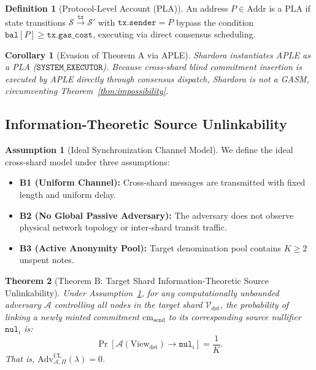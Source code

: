 \documentclass[journal,10pt,twocolumn]{IEEEtran}
\newtheorem{theorem}{Theorem}
\newtheorem{corollary}[theorem]{Corollary}
\theoremstyle{definition}
\newtheorem{definition}{Definition}
\newtheorem{assumption}{Assumption}
\theoremstyle{remark}
\begin{document}
\begin{definition}[Protocol-Level Account (PLA)]
An address $P \in \text{Addr}$ is a PLA if state transitions $\mathcal{S} \xrightarrow{\mathtt{tx}} \mathcal{S}'$ with $\mathtt{tx.sender} = P$ bypass the condition $\mathtt{bal}[P] \ge \mathtt{tx.gas\_cost}$, executing via direct consensus scheduling.
\end{definition}

\begin{corollary}[Evasion of Theorem A via APLE]
Shardora instantiates APLE as a PLA ($\mathtt{SYSTEM\_EXECUTOR}$). Because cross-shard blind commitment insertion is executed by APLE directly through consensus dispatch, Shardora is not a GASM, circumventing Theorem~\ref{thm:impossibility}.
\end{corollary}

\subsection{Information-Theoretic Source Unlinkability}

\begin{assumption}[Ideal Synchronization Channel Model]\label{assump:ideal}
We define the ideal cross-shard model under three assumptions:
\begin{itemize}
    \item \textbf{B1 (Uniform Channel):} Cross-shard messages are transmitted with fixed length and uniform delay.
    \item \textbf{B2 (No Global Passive Adversary):} The adversary does not observe physical network topology or inter-shard transit traffic.
    \item \textbf{B3 (Active Anonymity Pool):} Target denomination pool contains $K \ge 2$ unspent notes.
\end{itemize}
\end{assumption}

\begin{theorem}[Theorem B: Target Shard Information-Theoretic Source Unlinkability]\label{thm:source_unlink}
Under Assumption~\ref{assump:ideal}, for any computationally unbounded adversary $\mathcal{A}$ controlling all nodes in the target shard $\mathcal{V}_{\text{dst}}$, the probability of linking a newly minted commitment $\text{cm}_{\text{send}}$ to its corresponding source nullifier $\mathtt{nul}_i$ is:
\begin{equation}
\Pr[\mathcal{A}(\text{View}_{\text{dst}}) \to \mathtt{nul}_i] = \frac{1}{K}.
\end{equation}
That is, $\text{Adv}^{\text{CL}}_{\mathcal{A}, \Pi}(\lambda) = 0$.
\end{theorem}
\end{document}
